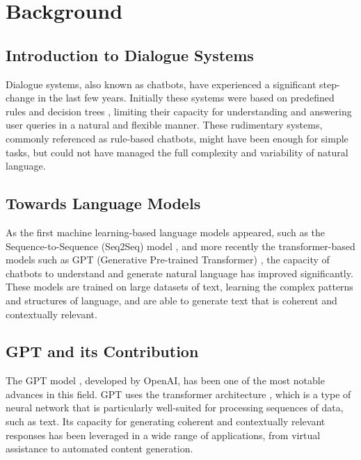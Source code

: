 \documentclass[a4paper,12pt,twoside]{ThesisStyle}
\begin{document}
\chapter{Background}
\label{cap:background}

\section{Introduction to Dialogue Systems}
\label{sec:chat}

Dialogue systems, also known as chatbots, have experienced a significant step-change in the last few years. Initially these systems were based on predefined rules and decision trees \cite{Weizenbaum1966ELIZA, AbuShawar2015ALICE}, limiting their capacity for understanding and answering user queries in a natural and flexible manner. These rudimentary systems, commonly referenced as rule-based chatbots, might have been enough for simple tasks, but could not have managed the full complexity and variability of natural language.

\section{Towards Language Models}
\label{sec:language}

As the first machine learning-based language models appeared, such as the Sequence-to-Sequence (Seq2Seq) model \cite{Sutskever2014SequenceSequenceLearningNeural}, and more recently the transformer-based models such as GPT (Generative Pre-trained Transformer) \cite{Vaswani2023AttentionNeed, Radford2018ImprovingLU}, the capacity of chatbots to understand and generate natural language has improved significantly. These models are trained on large datasets of text, learning the complex patterns and structures of language, and are able to generate text that is coherent and contextually relevant.

\section{GPT and its Contribution}
\label{sec:gpt}

The GPT model \cite{Radford2018ImprovingLU}, developed by OpenAI, has been one of the most notable advances in this field. GPT uses the transformer architecture \cite{Vaswani2023AttentionNeed}, which is a type of neural network that is particularly well-suited for processing sequences of data, such as text. Its capacity for generating coherent and contextually relevant responses has been leveraged in a wide range of applications, from virtual assistance to automated content generation.
\end{document}
